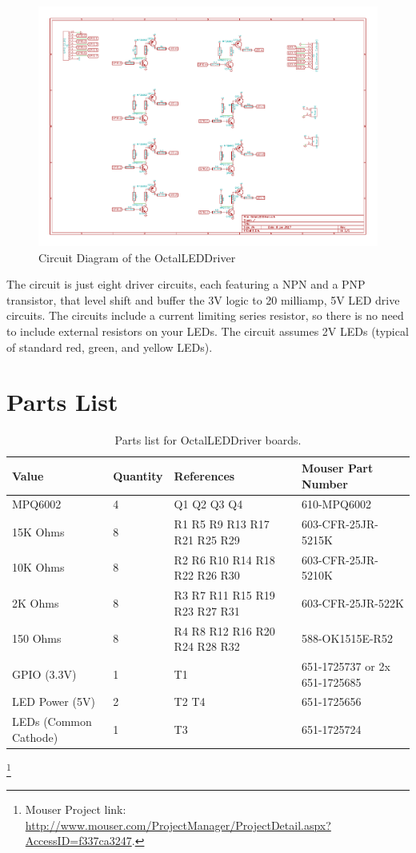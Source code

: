 \begin{figure}[hbpt]\begin{centering}%
\includegraphics[width=5in]{OctalLEDDriver.pdf}
\caption{Circuit Diagram of the OctalLEDDriver}
\end{centering}\end{figure}
The circuit is just eight driver circuits, each featuring a NPN and a PNP
transistor, that level shift and buffer the 3V logic to 20 milliamp, 5V LED
drive circuits. The circuits include a current limiting series resistor, so
there is no need to include external resistors on your LEDs. The circuit
assumes 2V LEDs (typical of standard red, green, and yellow LEDs).

\section{Parts List}

\begin{table}[htp]
\begin{centering}\begin{tabular}{|l|l|p{1in}|l|}
\hline
Value&Quantity&References&Mouser Part Number\\
\hline
MPQ6002&4&Q1 Q2 Q3 Q4&610-MPQ6002\\
\hline
15K Ohms&8&R1 R5 R9 R13 R17 R21 R25 R29&603-CFR-25JR-5215K\\
\hline
10K Ohms&8&R2 R6 R10 R14 R18 R22 R26 R30&603-CFR-25JR-5210K\\
\hline
2K Ohms&8&R3 R7 R11 R15 R19 R23 R27 R31&603-CFR-25JR-522K\\
\hline
150 Ohms&8&R4 R8 R12 R16 R20 R24 R28 R32&588-OK1515E-R52\\
\hline
GPIO (3.3V)&1&T1&651-1725737 or 2x 651-1725685 \\
\hline
LED Power (5V)&2&T2 T4&651-1725656\\
\hline
LEDs (Common Cathode)&1&T3&651-1725724\\
\hline
\end{tabular}
\caption{Parts list for OctalLEDDriver boards.}
\end{centering}\end{table}\footnote{Mouser Project link: 
\url{http://www.mouser.com/ProjectManager/ProjectDetail.aspx?AccessID=f337ca3247}.}

